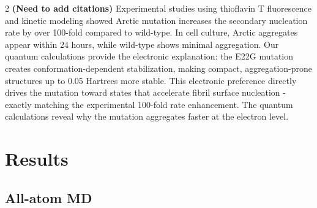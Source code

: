 \documentclass[10pt,a4paper]{article}
\begin{document}
\begin{multicols}{2}
\textbf{(Need to add citations)}
Experimental studies using thioflavin T fluorescence and kinetic modeling showed Arctic mutation increases the secondary nucleation rate by over 100-fold compared to wild-type. In cell culture, Arctic aggregates appear within 24 hours, while wild-type shows minimal aggregation. Our quantum calculations provide the electronic explanation: the E22G mutation creates conformation-dependent stabilization, making compact, aggregation-prone structures up to 0.05 Hartrees more stable. This electronic preference directly drives the mutation toward states that accelerate fibril surface nucleation - exactly matching the experimental 100-fold rate enhancement. The quantum calculations reveal why the mutation aggregates faster at the electron level.
        
		\section{Results}
        \subsection{\textbf{All-atom MD}}


\end{multicols}
\end{document}

